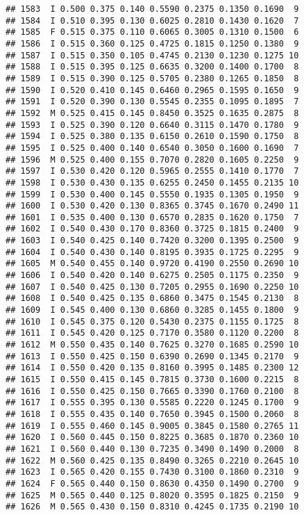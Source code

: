 \documentclass[
]{article}
\begin{document}
\begin{verbatim}
## 1583  I 0.500 0.375 0.140 0.5590 0.2375 0.1350 0.1690  9
## 1584  I 0.510 0.395 0.130 0.6025 0.2810 0.1430 0.1620  7
## 1585  F 0.515 0.375 0.110 0.6065 0.3005 0.1310 0.1500  6
## 1586  I 0.515 0.360 0.125 0.4725 0.1815 0.1250 0.1380  9
## 1587  I 0.515 0.350 0.105 0.4745 0.2130 0.1230 0.1275 10
## 1588  I 0.515 0.395 0.125 0.6635 0.3200 0.1400 0.1700  8
## 1589  I 0.515 0.390 0.125 0.5705 0.2380 0.1265 0.1850  8
## 1590  I 0.520 0.410 0.145 0.6460 0.2965 0.1595 0.1650  9
## 1591  I 0.520 0.390 0.130 0.5545 0.2355 0.1095 0.1895  7
## 1592  M 0.525 0.415 0.145 0.8450 0.3525 0.1635 0.2875  8
## 1593  I 0.525 0.390 0.120 0.6640 0.3115 0.1470 0.1780  9
## 1594  I 0.525 0.380 0.135 0.6150 0.2610 0.1590 0.1750  8
## 1595  I 0.525 0.400 0.140 0.6540 0.3050 0.1600 0.1690  7
## 1596  M 0.525 0.400 0.155 0.7070 0.2820 0.1605 0.2250  9
## 1597  I 0.530 0.420 0.120 0.5965 0.2555 0.1410 0.1770  7
## 1598  I 0.530 0.430 0.135 0.6255 0.2450 0.1455 0.2135 10
## 1599  I 0.530 0.400 0.145 0.5550 0.1935 0.1305 0.1950  9
## 1600  I 0.530 0.420 0.130 0.8365 0.3745 0.1670 0.2490 11
## 1601  I 0.535 0.400 0.130 0.6570 0.2835 0.1620 0.1750  7
## 1602  I 0.540 0.430 0.170 0.8360 0.3725 0.1815 0.2400  9
## 1603  I 0.540 0.425 0.140 0.7420 0.3200 0.1395 0.2500  9
## 1604  I 0.540 0.430 0.140 0.8195 0.3935 0.1725 0.2295  9
## 1605  M 0.540 0.455 0.140 0.9720 0.4190 0.2550 0.2690 10
## 1606  I 0.540 0.420 0.140 0.6275 0.2505 0.1175 0.2350  9
## 1607  I 0.540 0.425 0.130 0.7205 0.2955 0.1690 0.2250 10
## 1608  I 0.540 0.425 0.135 0.6860 0.3475 0.1545 0.2130  8
## 1609  I 0.545 0.400 0.130 0.6860 0.3285 0.1455 0.1800  9
## 1610  I 0.545 0.375 0.120 0.5430 0.2375 0.1155 0.1725  8
## 1611  I 0.545 0.420 0.125 0.7170 0.3580 0.1120 0.2200  8
## 1612  M 0.550 0.435 0.140 0.7625 0.3270 0.1685 0.2590 10
## 1613  I 0.550 0.425 0.150 0.6390 0.2690 0.1345 0.2170  9
## 1614  I 0.550 0.420 0.135 0.8160 0.3995 0.1485 0.2300 12
## 1615  I 0.550 0.415 0.145 0.7815 0.3730 0.1600 0.2215  8
## 1616  I 0.550 0.425 0.150 0.7665 0.3390 0.1760 0.2100  8
## 1617  I 0.555 0.395 0.130 0.5585 0.2220 0.1245 0.1700  9
## 1618  I 0.555 0.435 0.140 0.7650 0.3945 0.1500 0.2060  8
## 1619  I 0.555 0.460 0.145 0.9005 0.3845 0.1580 0.2765 11
## 1620  I 0.560 0.445 0.150 0.8225 0.3685 0.1870 0.2360 10
## 1621  I 0.560 0.440 0.130 0.7235 0.3490 0.1490 0.2000  8
## 1622  M 0.560 0.425 0.135 0.8490 0.3265 0.2210 0.2645 10
## 1623  I 0.565 0.420 0.155 0.7430 0.3100 0.1860 0.2310  9
## 1624  F 0.565 0.440 0.150 0.8630 0.4350 0.1490 0.2700  9
## 1625  M 0.565 0.440 0.125 0.8020 0.3595 0.1825 0.2150  9
## 1626  M 0.565 0.430 0.150 0.8310 0.4245 0.1735 0.2190 10

\end{verbatim}
\end{document}
